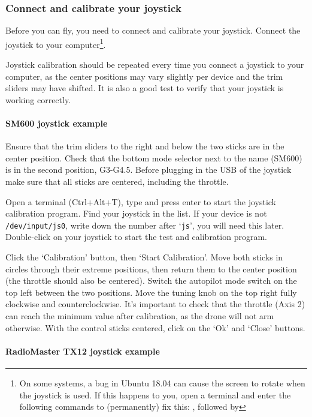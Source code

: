 \subsubsection*{Connect and calibrate your joystick}
Before you can fly, you need to connect and calibrate your joystick.
Connect the joystick to your computer\footnote{On some systems, a bug in Ubuntu 18.04 can cause the screen to rotate when the joystick is used. If this happens to you, open a terminal and enter the following commands to (permanently) fix this: , followed by }.

Joystick calibration should be repeated every time you connect a joystick to your computer, as the center positions may vary slightly per device and the trim sliders may have shifted. It is also a good test to verify that your joystick is working correctly.

\paragraph{SM600 joystick example}

Ensure that the trim sliders to the right and below the two sticks are in the center position. Check that the bottom mode selector next to the name (SM600) is in the second position, G3-G4.5. Before plugging in the USB of the joystick make sure that all sticks are centered, including the throttle.

Open a terminal (Ctrl+Alt+T), type  and press enter to start the joystick calibration program. Find your joystick in the list. If your device is not \texttt{/dev/input/js0}, write down the number after `\texttt{js}', you will need this later. Double-click on your joystick to start the test and calibration program.

Click the `Calibration' button, then `Start Calibration'. Move both sticks in circles through their extreme positions, then return them to the center position (the throttle should also be centered). Switch the autopilot mode switch on the top left between the two positions. Move the tuning knob on the top right fully clockwise and counterclockwise. It's important to check that the throttle (Axis 2) can reach the minimum value after calibration, as the drone will not arm otherwise. With the control sticks centered, click on the `Ok' and `Close' buttons. 

\paragraph{RadioMaster TX12 joystick example}


